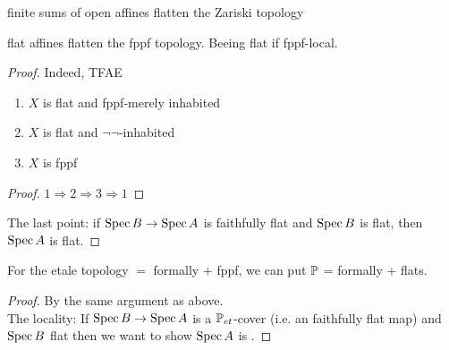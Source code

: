 \begin{example}
	 finite sums of open affines flatten the Zariski topology
\end{example}
\begin{example}
	flat affines flatten the fppf topology. Beeing flat if fppf-local.
\end{example}
\begin{proof}
	 Indeed, TFAE
	 \begin{enumerate}
	 	\item  $X$ is flat and fppf-merely inhabited
	 	\item $X$ is flat  and $\lnot\lnot$-inhabited
	 	\item $X$ is fppf
	 \end{enumerate}
 
	\begin{proof}
		$1 \Rightarrow 2 \Rightarrow 3 \Rightarrow 1$ \todocite
	\end{proof}	 
	The last point: if $\operatorname{Spec} B \to \operatorname{Spec} A$ is faithfully flat and $\operatorname{Spec} B$ is flat, then $\operatorname{Spec} A$ is flat.
\end{proof}
\begin{example}
	For the etale topology $=$ formally \etale $+$ fppf, we can put $\mathbb{P}$ = formally \etale + flats. %
\end{example}
\begin{proof}
	By the same argument as above. \\
	The locality: If $\operatorname{Spec} B \to \operatorname{Spec} A$ is a ${\mathbb{P}_{et}}$-cover (i.e. an \etale faithfully flat map) and $\operatorname{Spec} B$ \etale flat then we want to show $\operatorname{Spec} A$ is \etale. 
\end{proof}
